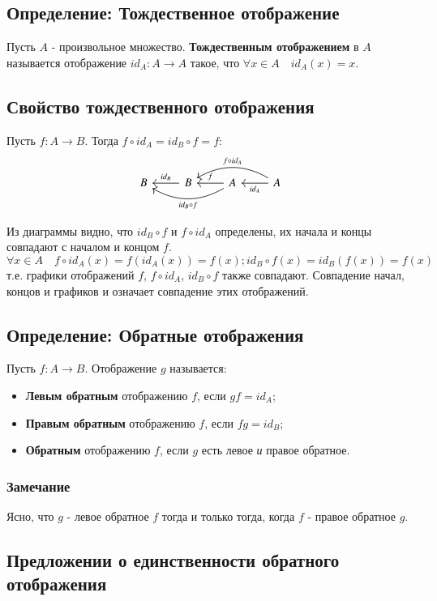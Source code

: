 \documentclass{article}
\begin{document}
\subsection{Определение: Тождественное отображение}
Пусть $A$ - произвольное множество. \textbf{Тождественным отображением} в $A$ называется отображение $id_A: A \rightarrow A$ такое, что $\forall x \in A \quad id_A(x) = x$.

\subsection{Свойство тождественного отображения}
Пусть $f: A \rightarrow B$. Тогда $f \circ id_A = id_B \circ f = f$:
%
\[
\begin{tikzcd}
B &B \lar["id_B"'] &A \ar[ll, bend left, "id_B \circ f"] \lar["f"'] &A \lar["id_A"] \ar[ll, bend right, "f \circ id_A"'] 
\end{tikzcd}
\]
%

Из диаграммы видно, что $id_B \circ f$ и $f \circ id_A$ определены, их начала и концы совпадают с началом и концом $f$. \[
	\forall x \in A \quad f \circ id_A(x) = f(id_A(x)) = f(x); id_B \circ f(x) = id_B(f(x)) = f(x)
\] т.е. графики отображений $f$, $f \circ id_A$, $id_B \circ f$ также совпадают. Совпадение начал, концов и графиков и означает совпадение этих отображений.

\subsection{Определение: Обратные отображения}
Пусть $f: A \rightarrow B$. Отображение $g$ называется:
\begin{itemize}
\item \textbf{Левым обратным} отображению $f$, если $gf = id_A$;
\item \textbf{Правым обратным} отображению $f$, если $fg = id_B$;
\item \textbf{Обратным} отображению $f$, если $g$ есть левое \textit{и} правое обратное.
\end{itemize}

\subsubsection*{Замечание}
Ясно, что $g$ - левое обратное $f$ тогда и только тогда, когда $f$ - правое обратное $g$.

\subsection{Предложении о единственности обратного отображения}
\end{document}
